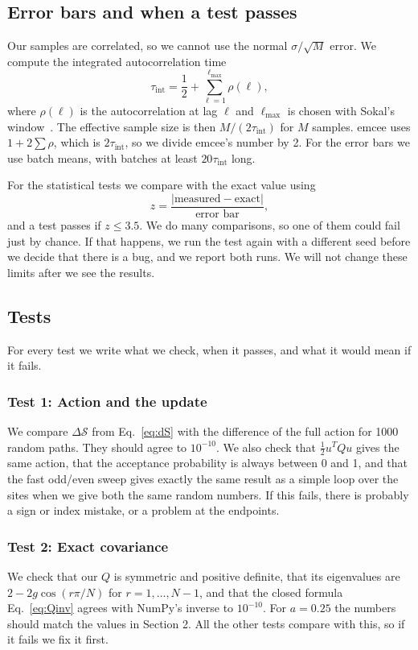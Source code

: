 \documentclass[11pt]{article}
\begin{document}
\subsection{Error bars and when a test passes}
Our samples are correlated, so we cannot use the normal $\sigma/\sqrt{M}$ error. We compute the integrated autocorrelation time
\begin{equation}
  \tau_{\text{int}} = \frac12 + \sum_{\ell=1}^{\ell_{\max}} \rho(\ell),
\end{equation}
where $\rho(\ell)$ is the autocorrelation at lag $\ell$ and $\ell_{\max}$ is chosen with Sokal's window~\cite{sokal}. The effective sample size is then $M/(2\tau_{\text{int}})$ for $M$ samples. emcee uses $1 + 2\sum\rho$, which is $2\tau_{\text{int}}$, so we divide emcee's number by 2. For the error bars we use batch means, with batches at least $20\tau_{\text{int}}$ long.

For the statistical tests we compare with the exact value using
\begin{equation}
  z = \frac{|\text{measured} - \text{exact}|}{\text{error bar}},
\end{equation}
and a test passes if $z \le 3.5$. We do many comparisons, so one of them could fail just by chance. If that happens, we run the test again with a different seed before we decide that there is a bug, and we report both runs. We will not change these limits after we see the results.

\subsection{Tests}
For every test we write what we check, when it passes, and what it would mean if it fails.

\subsubsection*{Test 1: Action and the update}
We compare $\Delta\mathcal S$ from Eq.~\eqref{eq:dS} with the difference of the full action for 1000 random paths. They should agree to $10^{-10}$. We also check that $\frac12 u^T Q u$ gives the same action, that the acceptance probability is always between 0 and 1, and that the fast odd/even sweep gives exactly the same result as a simple loop over the sites when we give both the same random numbers. If this fails, there is probably a sign or index mistake, or a problem at the endpoints.

\subsubsection*{Test 2: Exact covariance}
We check that our $Q$ is symmetric and positive definite, that its eigenvalues are $2 - 2g\cos(r\pi/N)$ for $r = 1, \dots, N-1$, and that the closed formula Eq.~\eqref{eq:Qinv} agrees with NumPy's inverse to $10^{-10}$. For $a = 0.25$ the numbers should match the values in Section 2. All the other tests compare with this, so if it fails we fix it first.
\end{document}
